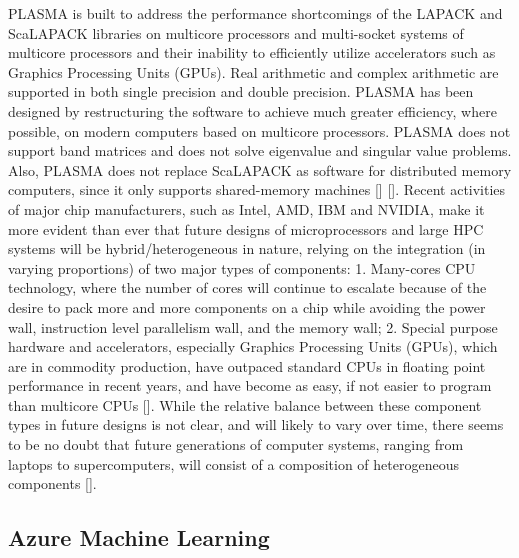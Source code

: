 PLASMA is built to address the performance shortcomings of the LAPACK
and ScaLAPACK libraries on multicore processors and multi-socket
systems of multicore processors and their inability to efficiently
utilize accelerators such as Graphics Processing Units (GPUs). Real
arithmetic and complex arithmetic are supported in both single
precision and double precision.  PLASMA has been designed by
restructuring the software to achieve much greater efficiency, where
possible, on modern computers based on multicore processors. PLASMA
does not support band matrices and does not solve eigenvalue and
singular value problems. Also, PLASMA does not replace ScaLAPACK as
software for distributed memory computers, since it only supports
shared-memory machines [\cite{paper-plasma-magma-1}]
[\cite{www-plasma-1}]. Recent activities of major chip manufacturers,
such as Intel, AMD, IBM and NVIDIA, make it more evident than ever
that future designs of microprocessors and large HPC systems will be
hybrid/heterogeneous in nature, relying on the integration (in varying
proportions) of two major types of components: 1. Many-cores CPU
technology, where the number of cores will continue to escalate
because of the desire to pack more and more components on a chip while
avoiding the power wall, instruction level parallelism wall, and the
memory wall; 2. Special purpose hardware and accelerators, especially
Graphics Processing Units (GPUs), which are in commodity production,
have outpaced standard CPUs in floating point performance in recent
years, and have become as easy, if not easier to program than
multicore CPUs [\cite{paper-plasma-magma-2, paper-plasma-magma-3}].
While the relative balance between these component types in future
designs is not clear, and will likely to vary over time, there seems
to be no doubt that future generations of computer systems, ranging
from laptops to supercomputers, will consist of a composition of
heterogeneous components
[\cite{paper-plasma-magma-4,paper-plasma-magma-5,paper-plasma-magma-6}].




\subsection{Azure Machine Learning}
    
